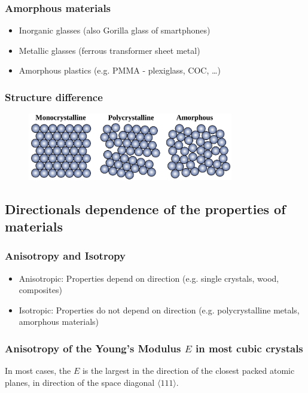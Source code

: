 \documentclass{article}
\begin{document}
\subsubsection{Amorphous materials}
\begin{itemize}
  \item Inorganic glasses (also Gorilla glass of smartphones)
  \item Metallic glasses (ferrous transformer sheet metal)
  \item Amorphous plastics (e.g. PMMA - plexiglass, COC, \dots)
\end{itemize}

\subsubsection{Structure difference}
\begin{figure}[ht!]
  \centering
  \includegraphics[width=0.8\textwidth]{media/mono_poly_amorph.jpg}
\end{figure}

\subsection{Directionals dependence of the properties of materials}
\subsubsection{Anisotropy and Isotropy}
\begin{itemize}
  \item Anisotropic: Properties depend on direction (e.g. single crystals, wood, composites)
  \item Isotropic: Properties do not depend on direction (e.g. polycrystalline metals, amorphous materials)
\end{itemize}

\subsubsection{Anisotropy of the Young's Modulus $E$ in most cubic crystals}
In most cases, the $E$ is the largest in the direction of the closest packed atomic planes,
in direction of the space diagonal $\langle 111 \rangle$.
\end{document}
